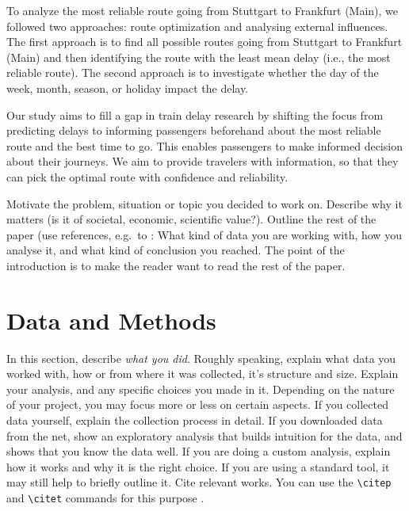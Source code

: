 \documentclass{article}
\theoremstyle{plain}
\theoremstyle{definition}
\theoremstyle{remark}
\begin{document}
To analyze the most reliable route going from Stuttgart to Frankfurt (Main), we followed two approaches: route optimization and analysing external influences. The first approach is to find all possible routes going from Stuttgart to Frankfurt (Main) and then identifying the route with the least mean delay (i.e., the most reliable route). The second approach is to investigate whether the day of the week, month, season, or holiday impact the delay.

Our study aims to fill a gap in train delay research by shifting the focus from predicting delays to informing passengers beforehand about the most reliable route and the best time to go. This enables passengers to make informed decision about their journeys. We aim to provide travelers with information, so that they can pick the optimal route with confidence and reliability.

Motivate the problem, situation or topic you decided to work on. Describe why it matters (is it of societal, economic, scientific value?). Outline the rest of the paper (use references, e.g.~to : What kind of data you are working with, how you analyse it, and what kind of conclusion you reached. The point of the introduction is to make the reader want to read the rest of the paper.

\section{Data and Methods}\label{sec:methods}

In this section, describe \emph{what you did}. Roughly speaking, explain what data you worked with, how or from where it was collected, it's structure and size. Explain your analysis, and any specific choices you made in it. Depending on the nature of your project, you may focus more or less on certain aspects. If you collected data yourself, explain the collection process in detail. If you downloaded data from the net, show an exploratory analysis that builds intuition for the data, and shows that you know the data well. If you are doing a custom analysis, explain how it works and why it is the right choice. If you are using a standard tool, it may still help to briefly outline it. Cite relevant works. You can use the \verb|\citep| and \verb|\citet| commands for this purpose \citep{mackay2003information}.

% 
\end{document}
